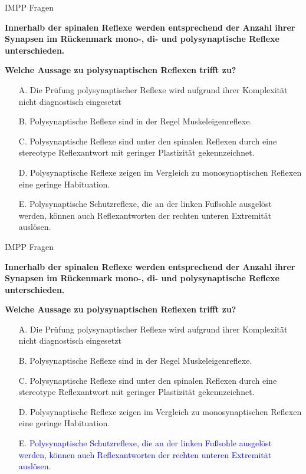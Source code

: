 \documentclass{beamer}
\begin{document}

\begin{frame}{IMPP Fragen}

\textbf{Innerhalb der spinalen Reflexe werden entsprechend der Anzahl ihrer Synapsen im Rückenmark mono-, di- und polysynaptische Reflexe unterschieden. }

\textbf{Welche Aussage zu polysynaptischen Reflexen trifft zu?} \\[0.2 cm]

\begin{itemize}
\item[A.] Die Prüfung polysynaptischer Reflexe wird aufgrund ihrer Komplexität nicht diagnostisch eingesetzt
\item[B.] Polysynaptische Reflexe sind in der Regel Muskeleigenreflexe.
\item[C.] Polysynaptische Reflexe sind unter den spinalen Reflexen durch eine stereotype Reflexantwort mit geringer Plastizität gekennzeichnet. 
\item[D.] Polysynaptische Reflexe zeigen im Vergleich zu monosynaptischen Reflexen eine geringe Habituation.
\item[E.] Polysynaptische Schutzreflexe, die an der linken Fußsohle ausgelöst werden, können auch Reflexantworten der rechten unteren Extremität auslösen. %

\end{itemize}
\end{frame}


\begin{frame}{IMPP Fragen}

\textbf{Innerhalb der spinalen Reflexe werden entsprechend der Anzahl ihrer Synapsen im Rückenmark mono-, di- und polysynaptische Reflexe unterschieden. }

\textbf{Welche Aussage zu polysynaptischen Reflexen trifft zu?} \\[0.2 cm]

\begin{itemize}
\item[A.] Die Prüfung polysynaptischer Reflexe wird aufgrund ihrer Komplexität nicht diagnostisch eingesetzt
\item[B.] Polysynaptische Reflexe sind in der Regel Muskeleigenreflexe.
\item[C.] Polysynaptische Reflexe sind unter den spinalen Reflexen durch eine stereotype Reflexantwort mit geringer Plastizität gekennzeichnet. 
\item[D.] Polysynaptische Reflexe zeigen im Vergleich zu monosynaptischen Reflexen eine geringe Habituation.
\item[E.] \textcolor{blue}{Polysynaptische Schutzreflexe, die an der linken Fußsohle ausgelöst werden, können auch Reflexantworten der rechten unteren Extremität auslösen.} %

\end{itemize}
\end{frame}
\end{document}
